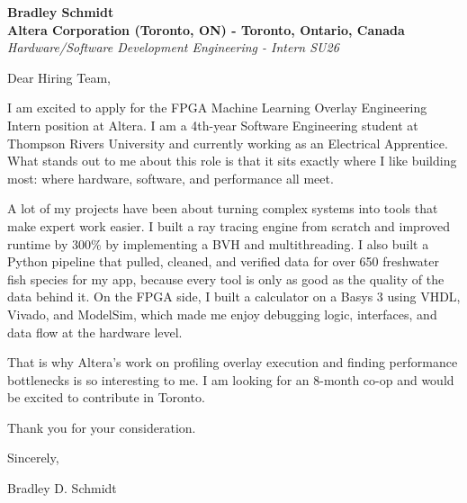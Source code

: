 \documentclass[11pt]{article}
\begin{document}
\textbf{Bradley Schmidt}\\
\vspace{0.5em}
\textbf{Altera Corporation (Toronto, ON) - Toronto, Ontario, Canada}\\
\textit{Hardware/Software Development Engineering - Intern SU26}

Dear Hiring Team,

\par

I am excited to apply for the FPGA Machine Learning Overlay Engineering Intern position at Altera. I am a 4th-year Software Engineering student at Thompson Rivers University and currently working as an Electrical Apprentice. What stands out to me about this role is that it sits exactly where I like building most: where hardware, software, and performance all meet.

\par

A lot of my projects have been about turning complex systems into tools that make expert work easier. I built a ray tracing engine from scratch and improved runtime by 300\% by implementing a BVH and multithreading. I also built a Python pipeline that pulled, cleaned, and verified data for over 650 freshwater fish species for my app, because every tool is only as good as the quality of the data behind it. On the FPGA side, I built a calculator on a Basys 3 using VHDL, Vivado, and ModelSim, which made me enjoy debugging logic, interfaces, and data flow at the hardware level.

\par

That is why Altera’s work on profiling overlay execution and finding performance bottlenecks is so interesting to me. I am looking for an 8-month co-op and would be excited to contribute in Toronto.

\par

Thank you for your consideration.

\par

Sincerely,

\par

Bradley D. Schmidt
\end{document}
